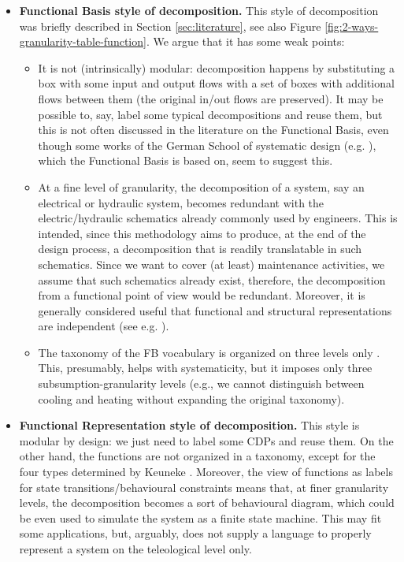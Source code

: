 \documentclass[
]{ceurart}
\begin{document}
\begin{itemize}
  \item \textbf{Functional Basis style of decomposition.} This style of decomposition was briefly described in Section \ref{sec:literature}, see also Figure \ref{fig:2-ways-granularity-table-function}. We argue that it has some weak points:
  \begin{itemize}
    \item It is not (intrinsically) modular: decomposition happens by substituting a box with some input and output flows with a set of boxes with additional flows between them (the original in/out flows are preserved). It may be possible to, say, label some typical decompositions and reuse them, but this is not often discussed in the literature on the Functional Basis, even though some works of the German School of systematic design (e.g. \cite{rothKonstruierenMitKonstruktionskatalogen2000}), which the Functional Basis is based on, seem to suggest this.
    \item At a fine level of granularity, the decomposition of a system, say an electrical or hydraulic system, becomes redundant with the electric/hydraulic schematics already commonly used by engineers. This is intended, since this methodology aims to produce, at the end of the design process, a decomposition that is readily translatable in such schematics. Since we want to cover (at least) maintenance activities, we assume that such schematics already exist, therefore, the decomposition from a functional point of view would be redundant. Moreover, it is generally considered useful that functional and structural representations are independent (see e.g. \cite{ISOIEC8134612009}).
    \item The taxonomy of the FB vocabulary is organized on three levels only \cite{hirtz_functional_2002}. This, presumably, helps with systematicity, but it imposes only three subsumption-granularity levels (e.g., we cannot distinguish between cooling and heating without expanding the original taxonomy).
  \end{itemize}
  \item \textbf{Functional Representation style of decomposition.} This style is modular by design: we just need to label some CDPs and reuse them. On the other hand, the functions are not organized in a taxonomy, except for the four types determined by Keuneke \cite{keuneke_device_1991}. Moreover, the view of functions as labels for state transitions/behavioural constraints means that, at finer granularity levels, the decomposition becomes a sort of behavioural diagram, which could be even used to simulate the system as a finite state machine. This may fit some applications, but, arguably, does not supply a language to properly represent a system on the teleological level only. %

\end{itemize}
\end{document}
